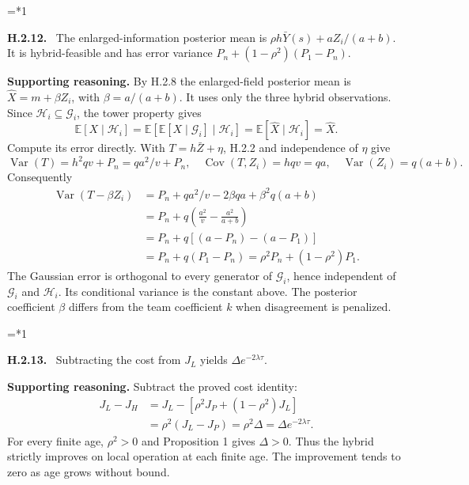 \documentclass[12pt,letterpaper]{article}
\newcommand{\E}{\mathbb E}
\newcommand{\Var}{\operatorname{Var}}
\newcommand{\Cov}{\operatorname{Cov}}
\newcommand{\G}{\mathcal G}
\newcommand{\HH}{\mathcal H}
\newenvironment{proofstep}[2]{%
  \begin{list}{}{\leftmargin=\dimexpr 0.17in*#2\relax%
  \setlength{\rightmargin}{0pt}\setlength{\topsep}{5pt}\setlength{\parsep}{2pt}}%
  \item[]\textbf{\textcolor{ink}{#1.}}\ }{\end{list}}
\begin{document}
\begin{proofstep}{H.2.12}{1}
\label{step:H.2.12}
The enlarged-information posterior mean is $\rho h\bar Y(s)+aZ_i/(a+b)$. It is hybrid-feasible and has error variance $P_n+(1-\rho^2)(P_1-P_n)$.

\textbf{Supporting reasoning.}
By H.2.8 the enlarged-field posterior mean is $\widehat X=m+\beta Z_i$, with $\beta=a/(a+b)$. It uses only the three hybrid observations. Since $\HH_i\subseteq\G_i$, the tower property gives
\[
\E[X\mid\HH_i]=\E[\E[X\mid\G_i]\mid\HH_i]=\E[\widehat X\mid\HH_i]=\widehat X.
\]
Compute its error directly. With $T=h\bar Z+\eta$, H.2.2 and independence of $\eta$ give
\[
\Var(T)=h^2qv+P_n=q a^2/v+P_n,
\quad\Cov(T,Z_i)=hqv=qa,
\quad\Var(Z_i)=q(a+b).
\]
Consequently
\begin{align*}
\Var(T-\beta Z_i)
&=P_n+q a^2/v-2\beta qa+\beta^2q(a+b)\\
&=P_n+q\left(\frac{a^2}{v}-\frac{a^2}{a+b}\right)\\
&=P_n+q[(a-P_n)-(a-P_1)]\\
&=P_n+q(P_1-P_n)=\rho^2P_n+(1-\rho^2)P_1.
\end{align*}
The Gaussian error is orthogonal to every generator of $\G_i$, hence independent of $\G_i$ and $\HH_i$. Its conditional variance is the constant above. The posterior coefficient $\beta$ differs from the team coefficient $k$ when disagreement is penalized.
\par{}
\end{proofstep}

\begin{proofstep}{H.2.13}{1}
\label{step:H.2.13}
Subtracting the cost from $J_L$ yields $\Delta e^{-2\lambda\tau}$.

\textbf{Supporting reasoning.}
Subtract the proved cost identity:
\begin{align*}
J_L-J_H
&=J_L-[\rho^2J_P+(1-\rho^2)J_L]\\
&=\rho^2(J_L-J_P)=\rho^2\Delta
=\Delta e^{-2\lambda\tau}.
\end{align*}
For every finite age, $\rho^2>0$ and Proposition 1 gives $\Delta>0$. Thus the hybrid strictly improves on local operation at each finite age. The improvement tends to zero as age grows without bound.
\par{}
\end{proofstep}
\end{document}
